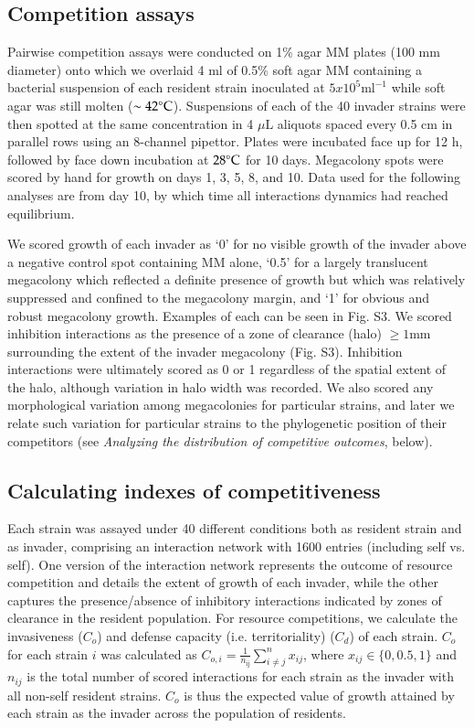 \documentclass[%
preprint,
superscriptaddress,
 amsmath,amssymb,
 aps,
]{revtex4-1}
\begin{document}
\subsection*{Competition assays}

Pairwise competition assays were conducted on 1\% agar MM plates (100 mm
diameter) onto which we overlaid 4 ml of 0.5\% soft agar MM containing a
bacterial suspension of each resident strain inoculated at
$5x10^{5} \text{ml}^{-1}$ while soft agar was still
molten ($\sim 42 \degree \text{C}$). Suspensions of each of the 40
invader strains were then spotted at the same concentration in 4 $\mu\text{L}$ aliquots spaced every 0.5 cm in parallel rows using an 8-channel
pipettor. Plates were incubated face up for 12 h, followed by face down
incubation at $28 \degree \text{C}$ for 10 days. Megacolony spots were scored by hand for growth on days 1, 3, 5, 8, and 10. Data used for the following
analyses are from day 10, by which time all interactions dynamics had
reached equilibrium.

We scored growth of each invader as `0' for no visible growth of the
invader above a negative control spot containing MM alone, `0.5' for a
largely translucent megacolony which reflected a definite presence of
growth but which was relatively suppressed and confined to the
megacolony margin, and `1' for obvious and robust megacolony growth.
Examples of each can be seen in Fig. S3. We scored inhibition
interactions as the presence of a zone of clearance (halo) $\geq 1 \text{mm}$
surrounding the extent of the invader megacolony (Fig. S3). Inhibition
interactions were ultimately scored as 0 or 1 regardless of the
spatial extent of the halo, although variation in halo width was
recorded. We also scored any morphological variation among megacolonies
for particular strains, and later we relate such variation for
particular strains to the phylogenetic position of their competitors
(see \emph{Analyzing the distribution of competitive outcomes}, below).

\subsection*{Calculating indexes of competitiveness}

Each strain was assayed under 40 different conditions both as resident
strain and as invader, comprising an interaction network with 1600
entries (including self vs. self). One version of the interaction
network represents the outcome of resource competition and details the
extent of growth of each invader, while the other captures the
presence/absence of inhibitory interactions indicated by zones of
clearance in the resident population. For resource competitions, we
calculate the invasiveness ($C_o$) and defense
capacity (i.e. territoriality) ($C_d$) of each
strain. $C_o$ for each strain $i$ was calculated as
$C_{o,i} = \frac{1}{n_{\text{ij}}}\sum_{i \neq j}^{n}x_{ij}$,
where $x_{ij} \in \{ 0,0.5,1\}$ and $n_{ij}$ is the
total number of scored interactions for each strain as the invader with
all non-self resident strains. $C_o$ is thus the
expected value of growth attained by each strain as the invader across
the population of residents.
\end{document}
